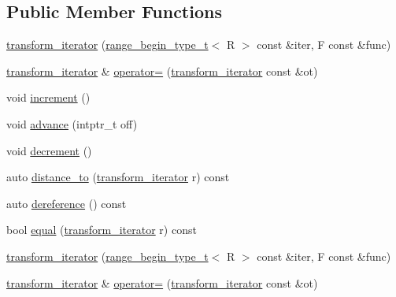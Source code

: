 \subsection*{Public Member Functions}
\begin{DoxyCompactItemize}
\item 
\mbox{\hyperlink{structrah_1_1view_1_1transform__iterator_ae8f127be961b14896c87d94e710a9a1a}{transform\+\_\+iterator}} (\mbox{\hyperlink{namespacerah_a28aff4eeddcece6be65ff0b956d32d4a}{range\+\_\+begin\+\_\+type\+\_\+t}}$<$ R $>$ const \&iter, F const \&func)
\item 
\mbox{\hyperlink{structrah_1_1view_1_1transform__iterator}{transform\+\_\+iterator}} \& \mbox{\hyperlink{structrah_1_1view_1_1transform__iterator_a4589b5fff7d8505b8a569c9d1f863929}{operator=}} (\mbox{\hyperlink{structrah_1_1view_1_1transform__iterator}{transform\+\_\+iterator}} const \&ot)
\item 
void \mbox{\hyperlink{structrah_1_1view_1_1transform__iterator_a1ee5c30f733b63b1cd26baa121389dd1}{increment}} ()
\item 
void \mbox{\hyperlink{structrah_1_1view_1_1transform__iterator_a56c602664659b11bfca3da418c6977be}{advance}} (intptr\+\_\+t off)
\item 
void \mbox{\hyperlink{structrah_1_1view_1_1transform__iterator_a05c99213d071102e793d57b967f7880d}{decrement}} ()
\item 
auto \mbox{\hyperlink{structrah_1_1view_1_1transform__iterator_ae0919c95985ebca42017346da790c981}{distance\+\_\+to}} (\mbox{\hyperlink{structrah_1_1view_1_1transform__iterator}{transform\+\_\+iterator}} r) const
\item 
auto \mbox{\hyperlink{structrah_1_1view_1_1transform__iterator_af72f5246736a89feca39293123a999e2}{dereference}} () const
\item 
bool \mbox{\hyperlink{structrah_1_1view_1_1transform__iterator_a68105373ae5ce99863589e17605f3833}{equal}} (\mbox{\hyperlink{structrah_1_1view_1_1transform__iterator}{transform\+\_\+iterator}} r) const
\item 
\mbox{\hyperlink{structrah_1_1view_1_1transform__iterator_ae8f127be961b14896c87d94e710a9a1a}{transform\+\_\+iterator}} (\mbox{\hyperlink{namespacerah_a28aff4eeddcece6be65ff0b956d32d4a}{range\+\_\+begin\+\_\+type\+\_\+t}}$<$ R $>$ const \&iter, F const \&func)
\item 
\mbox{\hyperlink{structrah_1_1view_1_1transform__iterator}{transform\+\_\+iterator}} \& \mbox{\hyperlink{structrah_1_1view_1_1transform__iterator_a4589b5fff7d8505b8a569c9d1f863929}{operator=}} (\mbox{\hyperlink{structrah_1_1view_1_1transform__iterator}{transform\+\_\+iterator}} const \&ot)

\end{DoxyCompactItemize}
